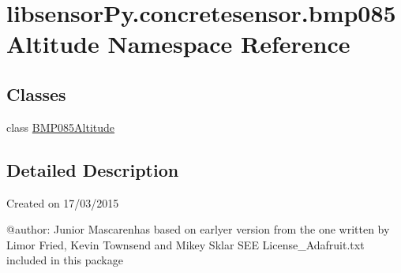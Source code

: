 \hypertarget{namespacelibsensorPy_1_1concretesensor_1_1bmp085Altitude}{}\section{libsensor\+Py.\+concretesensor.\+bmp085\+Altitude Namespace Reference}
\label{namespacelibsensorPy_1_1concretesensor_1_1bmp085Altitude}
\subsection*{Classes}
\begin{DoxyCompactItemize}
\item 
class \hyperlink{classlibsensorPy_1_1concretesensor_1_1bmp085Altitude_1_1BMP085Altitude}{B\+M\+P085\+Altitude}
\end{DoxyCompactItemize}


\subsection{Detailed Description}
\begin{DoxyVerb}Created on 17/03/2015

@author: Junior Mascarenhas
based on earlyer version from
the one written by Limor Fried, Kevin Townsend and Mikey Sklar
SEE License_Adafruit.txt included in this package
\end{DoxyVerb}
 